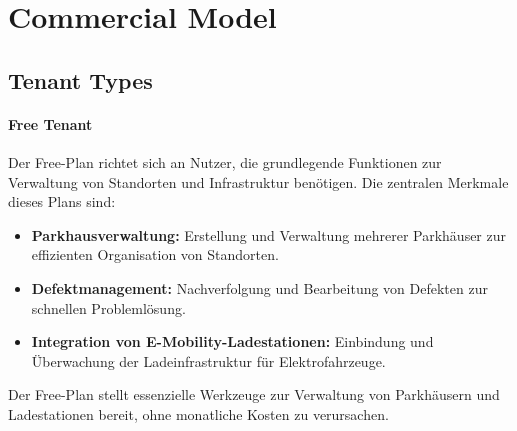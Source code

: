 \section{Commercial Model}
\subsection{Tenant Types}

\paragraph{Free Tenant}
Der Free-Plan richtet sich an Nutzer, die grundlegende Funktionen zur Verwaltung von Standorten und Infrastruktur benötigen. Die zentralen Merkmale dieses Plans sind:
\begin{itemize}
	\item \textbf{Parkhausverwaltung:} Erstellung und Verwaltung mehrerer Parkhäuser zur effizienten Organisation von Standorten.
	\item \textbf{Defektmanagement:} Nachverfolgung und Bearbeitung von Defekten zur schnellen Problemlösung.
	\item \textbf{Integration von E-Mobility-Ladestationen:} Einbindung und Überwachung der Ladeinfrastruktur für Elektrofahrzeuge.
\end{itemize}
Der Free-Plan stellt essenzielle Werkzeuge zur Verwaltung von Parkhäusern und Ladestationen bereit, ohne monatliche Kosten zu verursachen.


